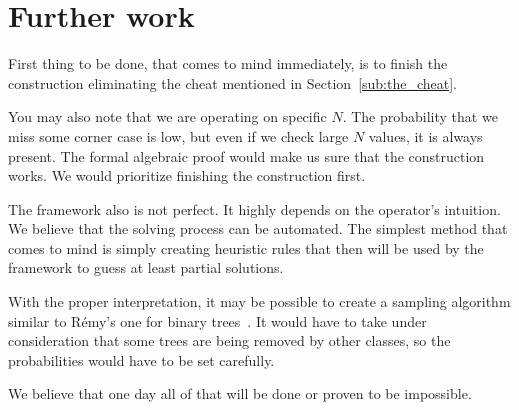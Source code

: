 \documentclass[final]{article}
\theoremstyle{definition}
\theoremstyle{definition}
\theoremstyle{remark}
\begin{document}
\section{Further work}%
\label{sec:further_work}

First thing to be done, that comes to mind immediately, is to finish the construction eliminating the cheat mentioned in Section~\ref{sub:the_cheat}.

You may also note that we are operating on specific \(N\). The probability that we miss some corner case is low, but even if we check large \(N\) values, it is always present. The formal algebraic proof would make us sure that the construction works. We would prioritize finishing the construction first.

The framework also is not perfect. It highly depends on the operator's intuition. We believe that the solving process can be automated. The simplest method that comes to mind is simply creating heuristic rules that then will be used by the framework to guess at least partial solutions.

With the proper interpretation, it may be possible to create a sampling algorithm similar to Rémy's one for binary trees~\cite{remy,note}. It would have to take under consideration that some trees are being removed by other classes, so the probabilities would have to be set carefully.

We believe that one day all of that will be done or proven to be impossible.

\clearpage

\printbibliography
\end{document}

